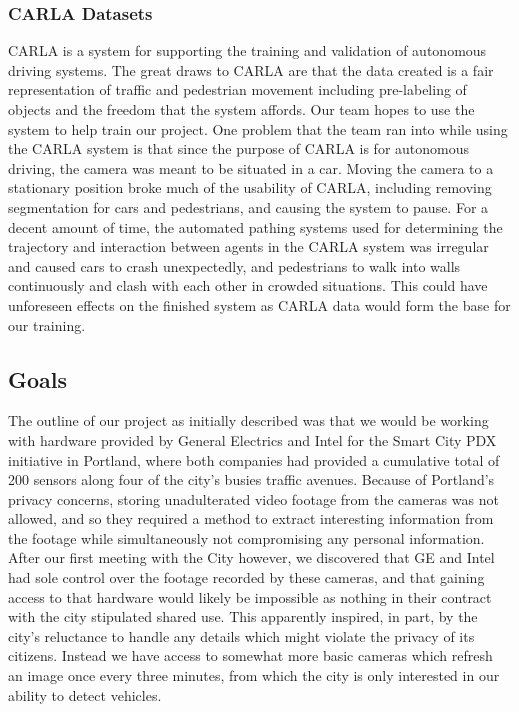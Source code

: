 \documentclass[onecolumn, draftclsnofoot,10pt, compsoc]{IEEEtran}
\begin{document}
\subsubsection{CARLA Datasets}
CARLA is a system for supporting the training and validation of  autonomous driving systems. The great draws to CARLA are that the data created is a fair representation of traffic and pedestrian movement including pre-labeling of objects and the freedom that the system affords. Our team hopes to use the system to help train our project.
One problem that the team ran into while using the CARLA system is that since the purpose of CARLA is for autonomous driving, the camera was meant to be situated in a car. Moving the camera to a stationary position broke much of the usability of CARLA, including removing segmentation for cars and pedestrians, and causing the system to pause. 
For a decent amount of time, the automated pathing systems used for determining the trajectory and interaction between agents in the CARLA system was irregular and caused cars to crash unexpectedly, and pedestrians to walk into walls continuously and clash with each other in crowded situations. This could have unforeseen effects on the finished system as CARLA data would form the base for our training.

\subsection{Goals}
The outline of our project as initially described was that we would be working with hardware provided by General Electrics and Intel for the Smart City PDX initiative in Portland, where both companies had provided a cumulative total of 200 sensors along four of the city’s busies traffic avenues. Because of Portland’s privacy concerns, storing unadulterated video footage from the cameras was not allowed, and so they required a method to extract interesting information from the footage while simultaneously not compromising any personal information. After our first meeting with the City however, we discovered that GE and Intel had sole control over the footage recorded by these cameras, and that gaining access to that hardware would likely be impossible as nothing in their contract with the city stipulated shared use. This apparently inspired, in part, by the city’s reluctance to handle any details which might violate the privacy of its citizens. Instead we have access to somewhat more basic cameras which refresh an image once every three minutes, from which the city is only interested in our ability to detect vehicles.
\end{document}
